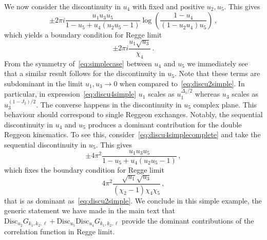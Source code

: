 We now consider the discontinuity in $u_4$ with fixed and positive $u_2, u_5$. This gives
\begin{equation}
  \label{eq:discu4simplecomplete}
  \pm 2\pi i\frac{u_1 u_3 u_5}{1-u_5+u_4(u_2 u_5-1)}\log\left(\frac{1-u_4}{(1-u_2 u_4)u_5}\right)\,,
\end{equation}
which yields a boundary condition for Regge limit
\begin{equation}
  \label{eq:discu4simple}
  \pm 2 \pi i \frac{u_1 \sqrt{u_3}}{\chi_4}\,.
\end{equation}
From the symmetry of~\eqref{eq:simplecase} between $u_4$ and $u_5$ we immediately see that a similar result follows for the discontinuity in $u_5$. Note that these terms are subdominant in the limit $u_1, u_3 \to 0$ when compared to~\eqref{eq:discu2simple}. In particular, in expression~\eqref{eq:discu4simple} $u_1$ scales as $u_1^{\Delta_1/2}$ whereas $u_3$ scales as $u_3^{(1-J_2)/2}$. The converse happens in the discontinuity in $u_5$ complex plane. This behaviour should correspond to single Reggeon exchanges. Notably, the sequential discontinuity in $u_4$ and $u_5$ produces a dominant contribution for the double Reggeon kinematics. To see this, consider~\eqref{eq:discu4simplecomplete} and take the sequential discontinuity in $u_5$. This gives
\begin{equation}
  \pm 4 \pi ^2 \frac{u_1 u_3 u_5}{1-u_5+u_4 \left(u_2 u_5-1\right)}\,,
\end{equation}
which fixes the boundary condition for Regge limit
\begin{equation}
  4 \pi ^2\frac{\sqrt{u_1} \sqrt{u_3}}{\left(\chi _2-1\right) \chi _4 \chi _5}\,,
\end{equation}
that is as dominant as~\eqref{eq:discu2simple}. We conclude in this simple example, the generic statement we have made in the main text that $\text{Disc}_{u_2}  G_{k_1,k_2, \ell}+ \text{Disc}_{u_5}\text{Disc}_{u_4} G_{k_1,k_2,\ell}$ provide the dominant contributions of the correlation function in Regge limit.

